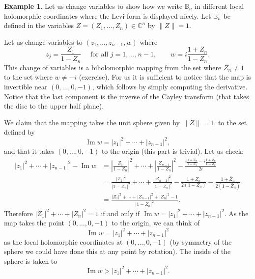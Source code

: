 \documentclass[12pt,openany]{book}
\renewcommand{\Im}{\operatorname{Im}}
\newcommand{\sabs}[1]{\lvert {#1} \rvert}
\newcommand{\snorm}[1]{\lVert {#1} \rVert}
\newcommand{\abs}[1]{\left\lvert {#1} \right\rvert}
\newcommand{\C}{{\mathbb{C}}}
\newcommand{\bB}{{\mathbb{B}}}
\theoremstyle{plain}
\theoremstyle{remark}
\theoremstyle{definition}
\theoremstyle{exercise}
\theoremstyle{example}
\newtheorem{example}[thm]{Example}
\begin{document}
\begin{example}
Let us change variables to show how we write $\bB_n$ in different
local holomorphic coordinates where the Levi-form is displayed nicely.
Let $\bB_n$ be defined in the variables $Z = (Z_1,\ldots,Z_n) \in \C^n$
by $\snorm{Z} = 1$.

Let us change variables 
to $(z_1,\ldots,z_{n-1},w)$ where
\begin{equation*}
z_j = \frac{Z_1}{1-Z_n} \quad \text{ for all $j=1,\ldots,n-1$}, \qquad
w = i\frac{1+Z_n}{1-Z_n} .
\end{equation*}
This change of variables is a biholomorphic mapping from the set where $Z_n \not= 1$
to the set where $w\not= -i$ (exercise).  For us it is 
sufficient to notice that the map is invertible near
$(0,\ldots,0,-1)$, which follows by simply computing the derivative.
Notice
that the last component is the inverse of the Cayley transform (that takes
the disc to the upper half plane).

We claim that the mapping takes the unit sphere given by $\snorm{Z} = 1$, to
the set defined by
\begin{equation*}
\Im w = \sabs{z_1}^2 + \cdots + \sabs{z_{n-1}}^2 ,
\end{equation*}
and that it takes $(0,\ldots,0,-1)$ to the origin (this part is trivial).
Let us check:
\begin{equation*}
\begin{split}
\sabs{z_1}^2 + \cdots + \sabs{z_{n-1}}^2 - \Im w
& =
\abs{\frac{Z_1}{1-Z_n}}^2
+ \cdots +
\abs{\frac{Z_{n-1}}{1-Z_n}}^2
-
\frac{
i\frac{1+Z_n}{1-Z_n} -
\overline{
i\frac{1+Z_n}{1-Z_n}}
}{2i}
\\
& =
\frac{\sabs{Z_1}^2}{\sabs{1-Z_n}^2}
+ \cdots +
\frac{\sabs{Z_{n-1}}^2}{\sabs{1-Z_n}^2}
-
\frac{1+Z_n}{2(1-Z_n)} -
\frac{1+\bar{Z}_n}{2(1-\bar{Z}_n)}
\\
& = 
\frac{\sabs{Z_1}^2 %
+ \cdots +
\sabs{Z_{n-1}}^2 %
+
\sabs{Z_n}^2-1}{\sabs{1-Z_n}^2} .
\end{split}
\end{equation*}
Therefore $\sabs{Z_1}^2 + \cdots + \sabs{Z_n}^2 = 1$ if and only if $\Im w =
\sabs{z_1}^2 + \cdots + \sabs{z_{n-1}}^2$.
As the map takes the point $(0,\ldots,0,-1)$ to the origin, we can
think of
\begin{equation*}
\Im w = \sabs{z_1}^2 + \cdots + \sabs{z_{n-1}}^2 
\end{equation*}
as the local holomorphic coordinates at $(0,\ldots,0,-1)$ (by symmetry
of the sphere we could have done this at any point by rotation).
The inside of the sphere is taken to
\begin{equation*}
\Im w > \sabs{z_1}^2 + \cdots + \sabs{z_{n-1}}^2 .
\end{equation*}


\end{example}
\end{document}
